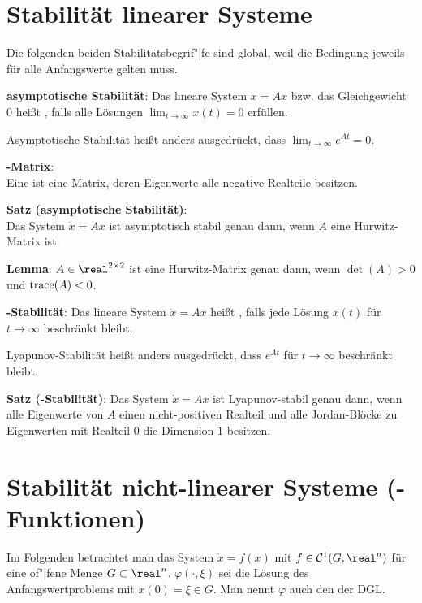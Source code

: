 \pagebreak

\section{%
    Stabilität linearer Systeme%
}

Die folgenden beiden Stabilitätsbegrif"|fe sind global, weil die Bedingung
jeweils für alle Anfangswerte gelten muss.

\textbf{asymptotische Stabilität}:
Das lineare System $\dot{x} = Ax$ bzw. das Gleichgewicht $0$ heißt
, falls
alle Lösungen $\lim_{t \to \infty} x(t) = 0$ erfüllen.

Asymptotische Stabilität heißt anders ausgedrückt,
dass $\lim_{t \to \infty} e^{At} = 0$.

\textbf{-Matrix}:\\
Eine  ist eine Matrix, deren Eigenwerte alle negative Realteile
besitzen.

\textbf{Satz (asymptotische Stabilität)}:\\
Das System $\dot{x} = Ax$ ist asymptotisch stabil genau dann,
wenn $A$ eine Hurwitz-Matrix ist.

\textbf{Lemma}:
$A \in \real^{2 \times 2}$ ist eine Hurwitz-Matrix genau dann, wenn $\det(A) > 0$ und
$\operatorname{trace}(A) < 0$.

\linie

\textbf{-Stabilität}:
Das lineare System $\dot{x} = Ax$ heißt ,
falls jede Lösung $x(t)$ für $t \to \infty$ beschränkt bleibt.

Lyapunov-Stabilität heißt anders ausgedrückt,
dass $e^{At}$ für $t \to \infty$ beschränkt bleibt.

\textbf{Satz (-Stabilität)}:
Das System $\dot{x} = Ax$ ist Lyapunov-stabil genau dann, wenn
alle Eigenwerte von $A$ einen nicht-positiven Realteil und
alle Jordan-Blöcke zu Eigenwerten mit Realteil $0$ die Dimension $1$ besitzen.

\pagebreak

\section{%
    Stabilität nicht-linearer Systeme (-Funktionen)%
}

Im Folgenden betrachtet man das System $\dot{x} = f(x)$ mit $f \in \C^1(G, \real^n)$
für eine of"|fene Menge $G \subset \real^n$.
$\varphi(\cdot, \xi)$ sei die Lösung des Anfangswertproblems mit $x(0) = \xi \in G$.
Man nennt $\varphi$ auch den  der DGL.

